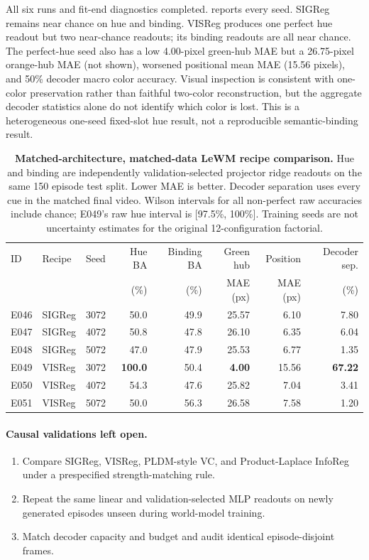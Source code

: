 \documentclass{article}
\begin{document}
All six runs and fit-end diagnostics completed.   reports
every seed.  SIGReg remains near chance on hue and binding.  VISReg produces one
perfect hue readout but two near-chance readouts; its binding readouts are all
near chance.  The perfect-hue seed also has a low 4.00-pixel green-hub MAE but a
26.75-pixel orange-hub MAE (not shown), worsened positional mean MAE (15.56
pixels), and 50\% decoder macro color accuracy.  Visual inspection is consistent
with one-color preservation rather than faithful two-color reconstruction, but
the aggregate decoder statistics alone do not identify which color is lost.
This is a heterogeneous one-seed fixed-slot hue result, not a reproducible
semantic-binding result.

\begin{table}[t]
\centering
\small
\setlength{\tabcolsep}{5pt}
\begin{tabular}{@{}llrrrrrr@{}}
\toprule
ID & Recipe & Seed & Hue BA & Binding BA & Green hub & Position & Decoder sep. \\
 & & & (\%) & (\%) & MAE (px) & MAE (px) & (\%) \\
\midrule
E046 & SIGReg & 3072 & 50.0 & 49.9 & 25.57 & 6.10 & 7.80 \\
E047 & SIGReg & 4072 & 50.8 & 47.8 & 26.10 & 6.35 & 6.04 \\
E048 & SIGReg & 5072 & 47.0 & 47.9 & 25.53 & 6.77 & 1.35 \\
E049 & VISReg & 3072 & \textbf{100.0} & 50.4 & \textbf{4.00} & 15.56 & \textbf{67.22} \\
E050 & VISReg & 4072 & 54.3 & 47.6 & 25.82 & 7.04 & 3.41 \\
E051 & VISReg & 5072 & 50.0 & 56.3 & 26.58 & 7.58 & 1.20 \\
\bottomrule
\end{tabular}
\caption{\textbf{Matched-architecture, matched-data LeWM recipe comparison.}  Hue and binding
are independently validation-selected projector ridge readouts on the same 150
episode test split.  Lower MAE is better.  Decoder separation uses every cue in
the matched final video.  Wilson intervals for all non-perfect raw accuracies
include chance; E049's raw hue interval is [97.5\%, 100\%].  Training seeds are
not uncertainty estimates for the original 12-configuration factorial.}
\label{tab:visreg-swap}
\end{table}

\paragraph{Causal validations left open.}
{\footnotesize
\begin{enumerate}[leftmargin=*,itemsep=0pt,topsep=2pt]
    \item Compare SIGReg, VISReg, PLDM-style VC, and Product-Laplace InfoReg under a prespecified
    strength-matching rule.
    \item Repeat the same linear and validation-selected MLP readouts on newly
    generated episodes unseen during world-model training.
    \item Match decoder capacity and budget and audit identical
    episode-disjoint frames.
\end{enumerate}
}
\end{document}
